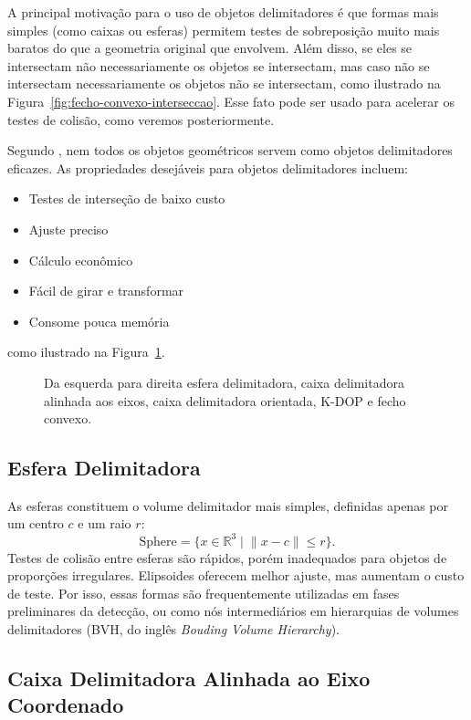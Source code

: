 A principal motivação para o uso de objetos delimitadores é que formas mais simples (como caixas ou esferas) permitem testes de sobreposição muito mais baratos do que a geometria original que envolvem. Além disso, se eles se intersectam não necessariamente os objetos se intersectam, mas caso não se intersectam necessariamente os objetos não se intersectam, como ilustrado na Figura~\ref{fig:fecho-convexo-interseccao}. Esse fato pode ser usado para acelerar os testes de colisão, como veremos posteriormente. 

Segundo , nem todos os objetos geométricos servem como objetos delimitadores eficazes. As propriedades desejáveis para objetos delimitadores incluem:
\begin{itemize}
	\item Testes de interseção de baixo custo
	\item Ajuste preciso
	\item Cálculo econômico
	\item Fácil de girar e transformar
	\item Consome pouca memória
\end{itemize}
como ilustrado na Figura~\ref{fig:formas-fecho-convexo}.

\begin{figure}[htb]
	\centering
	
	\caption{Da esquerda para direita esfera delimitadora, caixa delimitadora alinhada aos eixos, caixa delimitadora orientada, K-DOP e fecho convexo.}
	\label{fig:formas-fecho-convexo}
\end{figure}

\subsection*{Esfera Delimitadora}

As esferas constituem o volume delimitador mais simples, definidas apenas por um centro $c$ e um raio $r$:
$$
\text{Sphere} = \{ x \in \mathbb{R}^3 \; | \; \|x - c\| \le r \}.
$$
Testes de colisão entre esferas são rápidos, porém inadequados para objetos de proporções irregulares. Elipsoides oferecem melhor ajuste, mas aumentam o custo de teste. Por isso, essas formas são frequentemente utilizadas em fases preliminares da detecção, ou como nós intermediários em hierarquias de volumes delimitadores (BVH, do inglês \textit{Bouding Volume Hierarchy}).

\subsection*{Caixa Delimitadora Alinhada ao Eixo Coordenado}

